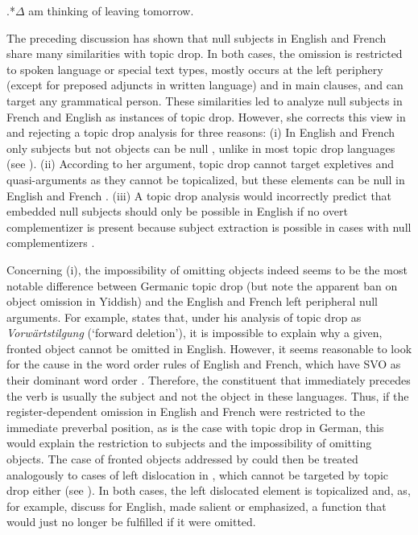 \ex.*\label{ex:clitized}$\Delta$ am thinking of leaving tomorrow. \citep[107, his judgment]{weir2012}

\largerpage[2]
The preceding discussion has shown that null subjects in English and French share many similarities with topic drop.
In both cases, the omission is restricted to spoken language or special text types,  mostly occurs at the left periphery (except for preposed adjuncts  in written language) and in main clauses, and can target any grammatical person.
These similarities led \citet{haegeman1990} to analyze null subjects in French and English as instances of topic drop.
However, she corrects this view in \citet{haegeman1997} and \citet{haegeman2007}  rejecting a topic drop analysis for three reasons:
(i) In English and French only subjects but not objects can be null \citep{haegeman1997,haegeman2007}, unlike in most topic drop languages (see ).
(ii) According to her argument, topic drop cannot target expletives  and quasi-arguments as they cannot be topicalized, but these elements can be null in English and French \citep{haegeman1997,haegeman2007}. 
(iii) A topic drop analysis would incorrectly predict that embedded  null subjects should only be possible in English if no overt complementizer  is present because subject extraction is possible in cases with null complementizers  \citep[103]{haegeman2007}.\clearpage

Concerning (i), the impossibility of omitting objects indeed seems to be the most notable difference between Germanic topic drop (but note the apparent ban on object omission in Yiddish) and the English and French left peripheral null arguments.
For example, \citet[178--179]{wilder1996} states that, under his analysis of topic drop as \textit{Vorwärtstilgung} (`forward deletion'), it is impossible to explain why a given,  fronted object cannot be omitted in English.
However, it seems reasonable to look for the cause in the word order rules of English and French, which have SVO as their dominant word order \citep{dryer2013a}.
Therefore, the constituent that immediately precedes the verb is usually the subject and not the object in these languages.
Thus, if the register-dependent omission in English and French were restricted to the immediate preverbal position, as is the case with topic drop in German, this would explain the restriction to subjects and the impossibility of omitting objects.
The case of fronted objects addressed by \citet[178--179]{wilder1996} could then be treated analogously to cases of left dislocation  in , which cannot be targeted by topic drop either (see ).
In both cases, the left dislocated element  is topicalized and, as, for example, \citet[161]{ward.birner1994} discuss for English, made salient  or emphasized, a function that would just no longer be fulfilled if it were omitted.

